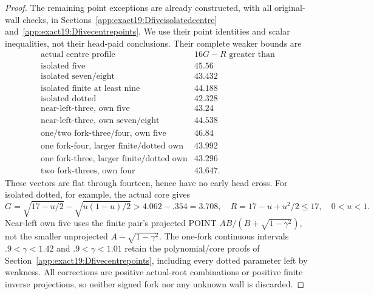 \documentclass[11pt]{article}
\theoremstyle{definition}
\theoremstyle{remark}
\begin{document}
\begin{proof}
The remaining point exceptions are already constructed, with all
original-wall checks, in Sections~\ref{app:exact19:Dfiveisolatedcentre}
and~\ref{app:exact19:Dfivecentrepoints}.
We use their point identities and scalar inequalities, not their
head-paid conclusions. Their complete weaker bounds are
\[
\begin{array}{l|r}
 \text{actual centre profile}&16G-R\text{ greater than}\\ \hline
 \text{isolated five}&45.56\\
 \text{isolated seven/eight}&43.432\\
 \text{isolated finite at least nine}&44.188\\
 \text{isolated dotted}&42.328\\
 \text{near-left-three, own five}&43.24\\
 \text{near-left-three, own seven/eight}&44.538\\
 \text{one/two fork-three/four, own five}&46.84\\
 \text{one fork-four, larger finite/dotted own}&43.992\\
 \text{one fork-three, larger finite/dotted own}&43.296\\
 \text{two fork-threes, own four}&43.647 .
\end{array}
\]
These vectors are flat through fourteen, hence have no early head cross.
For isolated dotted, for example, the actual core gives
\[
 G=\sqrt{17-u/2}-\sqrt{u(1-u)/2}>4.062-.354=3.708,\quad
 R=17-u+u^2/2\le17,\quad 0<u<1 .
\]
Near-left own five uses the finite pair's projected POINT
\(AB/(B+\sqrt{1-\gamma^2})\), not the smaller unprojected
\(A-\sqrt{1-\gamma^2}\).
The one-fork continuous intervals \(.9<\gamma<1.42\) and
\(.9<\gamma<1.01\) retain the polynomial/core proofs of
Section~\ref{app:exact19:Dfivecentrepoints}, including every dotted
parameter left by weakness.
All corrections are positive actual-root combinations or positive
finite inverse projections, so neither signed fork nor any unknown wall
is discarded.


\end{proof}
\end{document}
